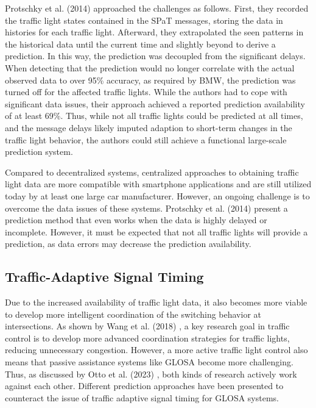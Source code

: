 Protschky et al. (2014) \cite{protschky_extensive_2014, protschky_adaptive_2014} approached the challenges as follows. First, they recorded the traffic light states contained in the SPaT messages, storing the data in histories for each traffic light. Afterward, they extrapolated the seen patterns in the historical data until the current time and slightly beyond to derive a prediction. In this way, the prediction was decoupled from the significant delays. When detecting that the prediction would no longer correlate with the actual observed data to over 95\% accuracy, as required by BMW, the prediction was turned off for the affected traffic lights. While the authors had to cope with significant data issues, their approach achieved a reported prediction availability of at least 69\%. Thus, while not all traffic lights could be predicted at all times, and the message delays likely imputed adaption to short-term changes in the traffic light behavior, the authors could still achieve a functional large-scale prediction system.

Compared to decentralized systems, centralized approaches to obtaining traffic light data are more compatible with smartphone applications and are still utilized today by at least one large car manufacturer. However, an ongoing challenge is to overcome the data issues of these systems. Protschky et al. (2014) \cite{protschky_extensive_2014, protschky_adaptive_2014} present a prediction method that even works when the data is highly delayed or incomplete. However, it must be expected that not all traffic lights will provide a prediction, as data errors may decrease the prediction availability.

\subsection{Traffic-Adaptive Signal Timing}

Due to the increased availability of traffic light data, it also becomes more viable to develop more intelligent coordination of the switching behavior at intersections. As shown by Wang et al. (2018) \cite{wang_review_2018}, a key research goal in traffic control is to develop more advanced coordination strategies for traffic lights, reducing unnecessary congestion. However, a more active traffic light control also means that passive assistance systems like GLOSA become more challenging. Thus, as discussed by Otto et al. (2023) \cite{otto_framework_2023}, both kinds of research actively work against each other. Different prediction approaches have been presented to counteract the issue of traffic adaptive signal timing for GLOSA systems. 

